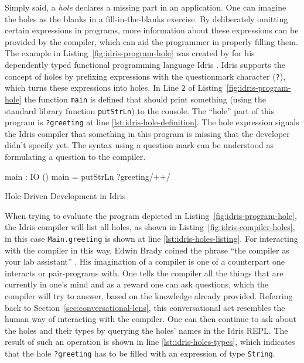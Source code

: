 Simply said, a \emph{hole} declares a missing part in an application.
One can imagine the holes as the blanks in a fill-in-the-blanks exercise.
By deliberately omitting certain expressions in programs, more information about these expressions can be provided by the compiler, which can aid the programmer in properly filling them.
The example in Listing~\ref{fig:idris-program-hole} was created by \citeauthor{brady_type-driven_2017} for his dependently typed functional programming language Idris \cite{brady_type-driven_2017}.
Idris supports the concept of holes by prefixing expressions with the questionmark character (\texttt{?}), which turns these expressions into holes.
In Line \verb|2| of Listing~\ref{fig:idris-program-hole} the function \verb|main| is defined that should print something (using the standard library function \verb|putStrLn|) to the console.
The ``hole'' part of this program is \verb|?greeting| at line \ref{lst:idris-hole-definition}.
The hole expression signals the Idris compiler that something in this program is missing that the developer didn't specify yet.
The syntax using a question mark can be understood as formulating a question to the compiler.

\begin{GenericCode}
main : IO ()
main = putStrLn ?greeting/+\label{lst:idris-hole-definition}+/
\caption{Hole-Driven Development in Idris}
\label{fig:idris-program-hole}
\end{GenericCode}

When trying to evaluate the program depicted in Listing~\ref{fig:idris-program-hole}, the Idris compiler will list all holes, as shown in Listing~\ref{fig:idris-compiler-holes}, in this case \texttt{Main.greeting} is shown at line \ref{lst:idris-holes-listing}.
For interacting with the compiler in this way, Edwin Brady coined the phrase ``the compiler as your lab assistant'' \cite{brady_type-driven_2017}.
His imagination of a compiler is one of a counterpart one interacts or pair-programs with.
One tells the compiler all the things that are currently in one's mind and as a reward one can ask questions, which the compiler will try to answer, based on the knowledge already provided.
Referring back to Section~\ref{sec:conversational-lens}, this conversational act resembles the human way of interacting with the compiler.
One can then continue to ask about the holes and their types by querying the holes' names in the Idris REPL.
The result of such an operation is shown in line \ref{lst:idris-holes-types}, which indicates that the hole \texttt{?greeting} has to be filled with an expression of type \texttt{String}.

